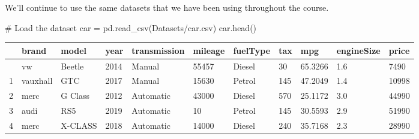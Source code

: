 \documentclass[
  letterpaper,
  DIV=11,
  numbers=noendperiod]{scrreprt}
\newenvironment{Shaded}{\begin{snugshade}}{\end{snugshade}}
\newcommand{\CommentTok}[1]{\textcolor[rgb]{0.37,0.37,0.37}{#1}}
\newcommand{\NormalTok}[1]{\textcolor[rgb]{0.00,0.23,0.31}{#1}}
\newcommand{\OperatorTok}[1]{\textcolor[rgb]{0.37,0.37,0.37}{#1}}
\newcommand{\StringTok}[1]{\textcolor[rgb]{0.13,0.47,0.30}{#1}}
\begin{document}
We'll continue to use the same datasets that we have been using
throughout the course.

\begin{Shaded}
\begin{Highlighting}[]
\CommentTok{\# Load the dataset}
\NormalTok{car }\OperatorTok{=}\NormalTok{ pd.read\_csv(}\StringTok{\textquotesingle{}Datasets/car.csv\textquotesingle{}}\NormalTok{)}
\NormalTok{car.head()}
\end{Highlighting}
\end{Shaded}

\begin{longtable}[]{@{}lllllllllll@{}}
\toprule\noalign{}
& brand & model & year & transmission & mileage & fuelType & tax & mpg &
engineSize & price \\
\midrule\noalign{}
\endhead
\bottomrule\noalign{}
\endlastfoot
0 & vw & Beetle & 2014 & Manual & 55457 & Diesel & 30 & 65.3266 & 1.6 &
7490 \\
1 & vauxhall & GTC & 2017 & Manual & 15630 & Petrol & 145 & 47.2049 &
1.4 & 10998 \\
2 & merc & G Class & 2012 & Automatic & 43000 & Diesel & 570 & 25.1172 &
3.0 & 44990 \\
3 & audi & RS5 & 2019 & Automatic & 10 & Petrol & 145 & 30.5593 & 2.9 &
51990 \\
4 & merc & X-CLASS & 2018 & Automatic & 14000 & Diesel & 240 & 35.7168 &
2.3 & 28990 \\
\end{longtable}
\end{document}
